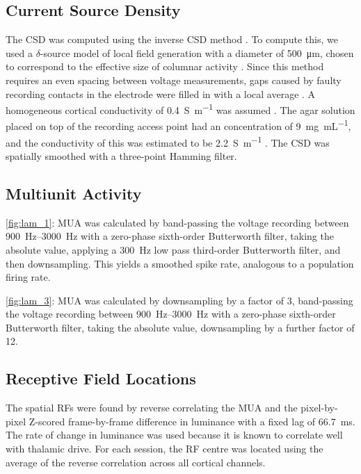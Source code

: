 \subsection{Current Source Density}

The \ac{CSD} was computed using the inverse \ac{CSD} method \citep{Pettersen2006}.
To compute this, we used a $\delta$-source model of local field generation with a diameter of \SI{500}{\micro\metre}, chosen to correspond to the effective size of columnar activity \citep{Horton2005,Lund2003}.
Since this method requires an even spacing between voltage measurements, gaps caused by faulty recording contacts in the electrode were filled in with a local average \citep{Wojcik2010}.
A homogeneous cortical conductivity of \SI{0.4}{\siemens\per\metre} was assumed \citep{Logothetis2007}.
The agar solution placed on top of the recording access point had an  concentration of \SI{9}{\mg\per\mL}, and the conductivity of this was estimated to be \SI{2.2}{\siemens\per\metre} \citep{Kandadai2012}.
The \ac{CSD} was spatially smoothed with a three-point Hamming filter.


\subsection{Multiunit Activity}

\autoref{fig:lam_1}: \ac{MUA} was calculated by band-passing the voltage recording between \SIrange{900}{3000}{Hz} with a zero-phase sixth-order Butterworth filter, taking the absolute value, applying a \SI{300}{Hz} low pass third-order Butterworth filter, and then downsampling.
This yields a smoothed spike rate, analogous to a population firing rate.

\autoref{fig:lam_3}: \ac{MUA} was calculated by downsampling by a factor of \num{3}, band-passing the voltage recording between \SIrange{900}{3000}{Hz} with a zero-phase sixth-order Butterworth filter, taking the absolute value, downsampling by a further factor of \num{12}.


\subsection{Receptive Field Locations}

The spatial \acp{RF} were found by reverse correlating the \ac{MUA} and the pixel-by-pixel Z-scored frame-by-frame difference in luminance with a fixed lag of \SI{66.7}{\milli\second}.
The rate of change in luminance was used because it is known to correlate well with thalamic drive.
For each session, the \ac{RF} centre was located using the average of the reverse correlation across all cortical channels.


